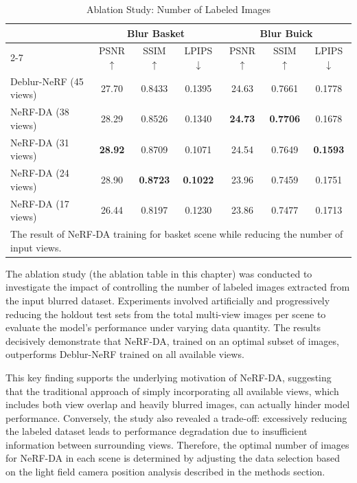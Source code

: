 \begin{table}[htbp]
\centering
\begin{tabular}{l||ccc|ccc}
\hline\hline
& \multicolumn{3}{c|}{Blur Basket} & \multicolumn{3}{c}{Blur Buick} \\
\cline{2-7}
& PSNR$\uparrow$ & SSIM$\uparrow$ & LPIPS$\downarrow$ & PSNR$\uparrow$ & SSIM$\uparrow$ & LPIPS$\downarrow$ \\
\hline
Deblur-NeRF (45 views) & 27.70 & 0.8433 & 0.1395 & 24.63 & 0.7661 & 0.1778 \\
\hline
NeRF-DA (38 views) & 28.29 & 0.8526 & 0.1340 & \textbf{24.73} & \textbf{0.7706} & 0.1678 \\
NeRF-DA (31 views) & \textbf{28.92} & 0.8709 & 0.1071 & 24.54 & 0.7649 & \textbf{0.1593} \\
NeRF-DA (24 views) & 28.90 & \textbf{0.8723} & \textbf{0.1022} & 23.96 & 0.7459 & 0.1751 \\
NeRF-DA (17 views) & 26.44 & 0.8197 & 0.1230 & 23.86 & 0.7477 & 0.1713 \\
\hline\hline
\multicolumn{7}{l}{\footnotesize The result of NeRF-DA training for basket scene while reducing the number of input views.}
\end{tabular}
\caption{Ablation Study: Number of Labeled Images}
\end{table}

The ablation study (the ablation table in this chapter) was conducted to investigate the impact of controlling the number of labeled images extracted from the input blurred dataset. Experiments involved artificially and progressively reducing the holdout test sets from the total multi-view images per scene to evaluate the model's performance under varying data quantity. The results decisively demonstrate that NeRF-DA, trained on an optimal subset of images, outperforms Deblur-NeRF trained on all available views.

This key finding supports the underlying motivation of NeRF-DA, suggesting that the traditional approach of simply incorporating all available views, which includes both view overlap and heavily blurred images, can actually hinder model performance. Conversely, the study also revealed a trade-off: excessively reducing the labeled dataset leads to performance degradation due to insufficient information between surrounding views. Therefore, the optimal number of images for NeRF-DA in each scene is determined by adjusting the data selection based on the light field camera position analysis described in the methods section.
